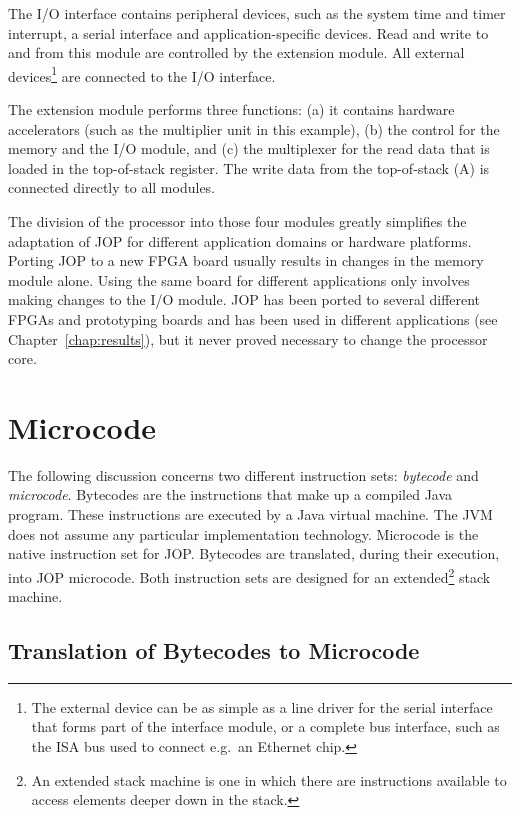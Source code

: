 The I/O interface contains peripheral devices, such as the system
time and timer interrupt, a serial interface and
application-specific devices. Read and write to and from this module
are controlled by the extension module. All external
devices\footnote{The external device can be as simple as a line
driver for the serial interface that forms part of the interface
module, or a complete bus interface, such as the ISA bus used to
connect e.g.\ an Ethernet chip.} are connected to the I/O interface.

The extension module performs three functions: (a) it contains
hardware accelerators (such as the multiplier unit in this example),
(b) the control for the memory and the I/O module, and (c) the
multiplexer for the read data that is loaded in the top-of-stack
register. The write data from the top-of-stack (A) is connected
directly to all modules.

The division of the processor into those four modules greatly
simplifies the adaptation of JOP for different application domains
or hardware platforms. Porting JOP to a new FPGA board usually
results in changes in the memory module alone. Using the same board
for different applications only involves making changes to the I/O
module. JOP has been ported to several different FPGAs and
prototyping boards and has been used in different applications (see
Chapter~\ref{chap:results}), but it never proved necessary to change
the processor core.

\section{Microcode}
\label{sec:microcode}

The following discussion concerns two different instruction sets:
\emph{bytecode} and \emph{microcode}. Bytecodes are the instructions
that make up a compiled Java program. These instructions are
executed by a Java virtual machine. The JVM does not assume any
particular implementation technology. Microcode is the native
instruction set for JOP. Bytecodes are translated, during their
execution, into JOP microcode. Both instruction sets are designed
for an extended\footnote{An extended stack machine is one in which
there are instructions available to access elements deeper down in
the stack.} stack machine.

\subsection{Translation of Bytecodes to Microcode}

